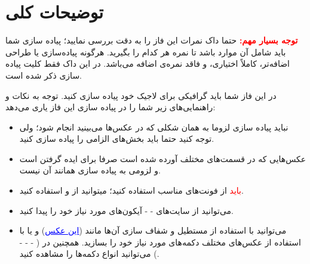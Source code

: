 \documentclass[]{article}
\begin{document}
\newpage

\section*{{\titr توضیحات کلی}}

\textbf{\textcolor{red}{توجه بسیار مهم:}}
حتما داک نمرات این فاز را به دقت بررسی نمایید؛ پیاده سازی شما باید شامل آن موارد باشد تا نمره هر کدام را بگیرید. هرگونه پیاده‌سازی یا طراحی اضافه‌تر، کاملاً اختیاری، و فاقد نمره‌ی اضافه می‌باشد. در این داک فقط کلیت پیاده سازی ذکر شده است.

در این فاز شما باید گرافیکی برای لاجیک خود پیاده سازی کنید. توجه به نکات و راهنمایی‌های زیر شما را در پیاده سازی این فاز یاری می‌دهد:


\begin{itemize}
\item
نباید پیاده سازی لزوما به همان شکلی که در عکس‌ها می‌بینید انجام شود؛ ولی توجه کنید حتما باید بخش‌های الزامی را پیاده سازی کنید.

\item
عکس‌هایی که در قسمت‌های مختلف آورده شده است صرفا برای ایده گرفتن است و لزومی به پیاده سازی همانند آن نیست.


\item
\textcolor{red}{باید}
 از فونت‌های مناسب استفاده کنید؛ میتوانید از
   \href{https://www.kenney.nl/assets/kenney-fonts}{\textcolor{blue}{\underline{}}}
    و
     \href{https://www.behance.net/collection/4860923/Free-Fonts}{\textcolor{blue}{\underline{}}}
    استفاده کنید.

\item

می‌توانید از سایت‌های
 \href{https://www.flaticon.com/}{\textcolor{blue}{\underline{}}} 
 - 
 \href{https://icons8.com/}{\textcolor{blue}{\underline{}}}
  -
   \href{https://www.iconninja.com/}{\textcolor{blue}{\underline{}}}
   آیکون‌های مورد نیاز خود را پیدا کنید.

\item

می‌توانید با استفاده از مستطیل و شفاف سازی آن‌ها مانند
 (\href{https://raw.githubusercontent.com/titansarus/Documents/master/phase_2/main/images/img1.jpg}{\textcolor{blue}{\underline{{این عکس}}}})  و یا با استفاده از عکس‌های مختلف  دکمه‌های مورد نیاز خود را بسازید. همچنین در 
  (
\href{https://hannemann.itch.io/ui-button-pack-free}{\textcolor{blue}{\underline{}}}
 - \href{https://www.vecteezy.com/vector-art/116983-digital-game-button}{\textcolor{blue}{\underline{}}}
  -
  \href{https://www.clickminded.com/button-generator/}{\textcolor{blue}{\underline{}}} -
   \href{https://pngtree.com/free-png-vectors/hexagon}{\textcolor{blue}{\underline{}}}
   ) می‌توانید انواع دکمه‌ها را مشاهده کنید.



\end{itemize}
\end{document}
